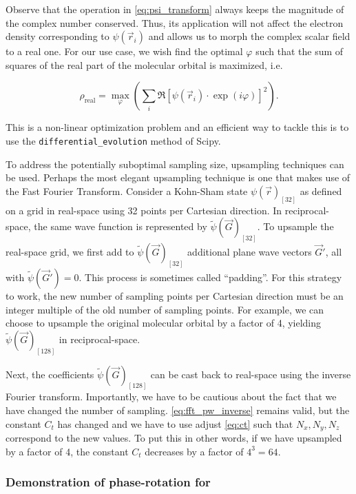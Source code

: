 Observe that the operation in \cref{eq:psi_transform} always keeps the magnitude of the complex number conserved. Thus, its application will not affect the electron density corresponding to $\psi(\vec{r}_{i})$ and allows us to morph the complex scalar field to a real one. For our use case, we wish find the optimal $\varphi$ such that the sum of squares of the real part of the molecular orbital is maximized, i.e.

\begin{equation}
    \rho_{\text{real}} = \max_\varphi \left(\sum_{i}\mathfrak{R}\left[ \psi(\vec{r}_{i}) \cdot \exp \left(i \varphi \right)\right]^{2} \right).
    \label{eq:optimize_real}
\end{equation}

This is a non-linear optimization problem and an efficient way to tackle this is to use the \texttt{differential\_evolution} method of Scipy.\cite{differential_evolution}

To address the potentially suboptimal sampling size, upsampling techniques can be used. Perhaps the most elegant upsampling technique is one that makes use of the Fast Fourier Transform. Consider a Kohn-Sham state $\psi(\vec{r})_{[32]}$ as defined on a grid in real-space using 32 points per Cartesian direction. In reciprocal-space, the same wave function is represented by $\tilde{\psi}(\vec{G})_{[32]}$. To upsample the real-space grid, we first add to $\tilde{\psi}(\vec{G})_{[32]}$ additional plane wave vectors $\vec{G}\prime$, all with $\tilde{\psi}(\vec{G}\prime) = 0$. This process is sometimes called ``padding''. For this strategy to work, the new number of sampling points per Cartesian direction must be an integer multiple of the old number of sampling points. For example, we can choose to upsample the original molecular orbital by a factor of 4, yielding $\tilde{\psi}(\vec{G})_{[128]}$ in reciprocal-space.

Next, the coefficients $\tilde{\psi}(\vec{G})_{[128]}$ can be cast back to real-space using the inverse Fourier transform. Importantly, we have to be cautious about the fact that we have changed the number of sampling. \cref{eq:fft_pw_inverse} remains valid, but the constant $C_{t}$ has changed and we have to use adjust \cref{eq:ct} such that $N_{x},N_{y},N_{z}$ correspond to the new values. To put this in other words, if we have upsampled by a factor of 4, the constant $C_{t}$ decreases by a factor of $4^{3}=64$.

%
%
%
\subsubsection{Demonstration of phase-rotation for }


